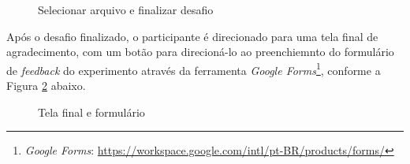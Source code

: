 \documentclass[english,brazilian]{UNISINOSartigo} %
\begin{document}
\begin{figure}[ht]
    \caption{Selecionar arquivo e finalizar desafio}
    \label{fig:selecionar_arquivo_finalizar_desafio}
    \centering
    \footnotesize
    \begin{minipage}{.9\textwidth}
        \centering
    \end{minipage}
\end{figure}
\FloatBarrier

Após o desafio finalizado, o participante é direcionado para uma tela final de agradecimento, com um botão para direcioná-lo ao preenchiemnto do formulário de \textit{feedback} do experimento através da ferramenta \textit{Google Forms}\footnote{\textit{Google Forms}: \url{https://workspace.google.com/intl/pt-BR/products/forms/}}, conforme a Figura \ref{fig:tela_final_formulario} abaixo.

\begin{figure}[ht]
    \caption{Tela final e formulário}
    \label{fig:tela_final_formulario}
    \centering
    \footnotesize
    \begin{minipage}{.9\textwidth}
        \centering
    \end{minipage}
\end{figure}
\FloatBarrier
\end{document}
